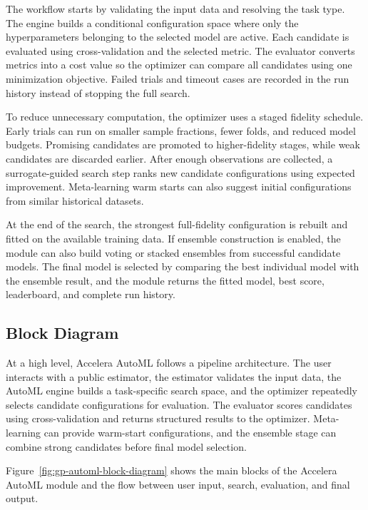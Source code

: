 \documentclass[12pt,a4paper]{report}
\begin{document}
\noindent The workflow starts by validating the input data and resolving the task type.
The engine builds a conditional configuration space where only the
hyperparameters belonging to the selected model are active. Each candidate is
evaluated using cross-validation and the selected metric. The evaluator converts
metrics into a cost value so the optimizer can compare all candidates using one
minimization objective. Failed trials and timeout cases are recorded in the run
history instead of stopping the full search.

\noindent To reduce unnecessary computation, the optimizer uses a staged fidelity
schedule. Early trials can run on smaller sample fractions, fewer folds, and
reduced model budgets. Promising candidates are promoted to higher-fidelity
stages, while weak candidates are discarded earlier. After enough observations
are collected, a surrogate-guided search step ranks new candidate configurations
using expected improvement. Meta-learning warm starts can also suggest initial
configurations from similar historical datasets.

\noindent At the end of the search, the strongest full-fidelity configuration is rebuilt
and fitted on the available training data. If ensemble construction is enabled,
the module can also build voting or stacked ensembles from successful candidate
models. The final model is selected by comparing the best individual model with
the ensemble result, and the module returns the fitted model, best score,
leaderboard, and complete run history.

\subsection{Block Diagram}
At a high level, Accelera AutoML follows a pipeline architecture. The user
interacts with a public estimator, the estimator validates the input data, the
AutoML engine builds a task-specific search space, and the optimizer repeatedly
selects candidate configurations for evaluation. The evaluator scores
candidates using cross-validation and returns structured results to the
optimizer. Meta-learning can provide warm-start configurations, and the ensemble
stage can combine strong candidates before final model selection.



Figure~\ref{fig:gp-automl-block-diagram} shows the main blocks of the
Accelera AutoML module and the flow between user input, search, evaluation, and
final output.
\end{document}
